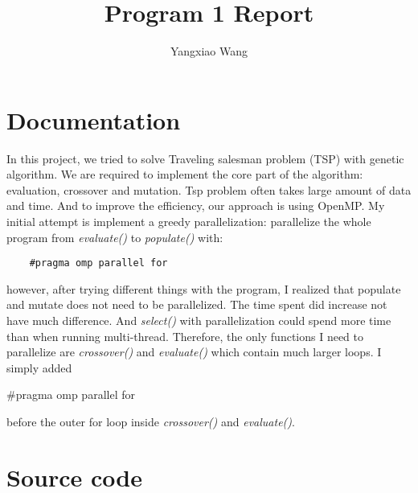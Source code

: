 \documentclass[11pt, letterpaper]{article}
\title{Program 1 Report}
\author{Yangxiao Wang}
\date{ }
\begin{document}
	
	\maketitle
	
	\tableofcontents
	\pagebreak
	
	\section{Documentation}
	In this project, we tried to solve Traveling salesman problem (TSP) with genetic algorithm. We are required to implement the core part of the algorithm: evaluation, crossover and mutation. Tsp problem often takes large amount of data and time. And to improve the efficiency, our approach is using OpenMP. My initial attempt is implement a greedy parallelization: parallelize the whole program from \textit{evaluate()} to \textit{populate()} with: \begin{lstlisting}
	#pragma omp parallel for
	\end{lstlisting}
	however, after trying different things with the program, I realized that populate and mutate does not need to be parallelized. The time spent did increase not have much difference. And \textit{select()} with parallelization could spend more time than when running multi-thread. Therefore, the only functions I need to parallelize are \textit{crossover()} and \textit{evaluate()} which contain much larger loops. I simply added \begin{small}
	\#pragma omp parallel for
	\end{small} before the outer for loop inside \textit{crossover()} and \textit{evaluate()}. \par
	
	
	
	\section {Source code}
\end{document}
